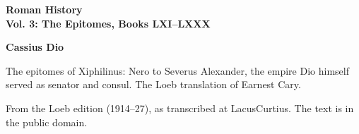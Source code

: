 \documentclass[11pt,letterpaper]{article}
\begin{document}
\color{ink}

\begin{titlepage}
\centering
\vspace*{4em}
{\LARGE\bfseries\color{heading} Roman History\\[0.3em]Vol. 3: The Epitomes, Books LXI--LXXX\par}
\vspace{2em}
{\Large\bfseries\color{heading} Cassius Dio\par}
\vspace{2.5em}
{\itshape\color{subhead}\parbox{0.8\linewidth}{\centering The epitomes of Xiphilinus: Nero to Severus Alexander, the empire Dio himself served as senator and consul. The Loeb translation of Earnest Cary.\par}}
\vfill
{\small From the Loeb edition (1914--27), as transcribed at LacusCurtius. The text is in the public domain.\par}
\vspace{2em}
\end{titlepage}

\tableofcontents


\end{document}
